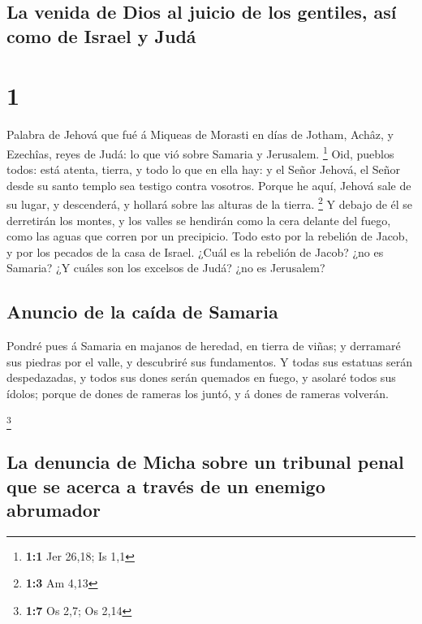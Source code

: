 \hypertarget{la-venida-de-dios-al-juicio-de-los-gentiles-asuxed-como-de-israel-y-juduxe1}{%
\subsection{La venida de Dios al juicio de los gentiles, así como de
Israel y
Judá}\label{la-venida-de-dios-al-juicio-de-los-gentiles-asuxed-como-de-israel-y-juduxe1}}

\hypertarget{section}{%
\section{1}\label{section}}

 Palabra de Jehová que fué á Miqueas de Morasti en días de
Jotham, Achâz, y Ezechîas, reyes de Judá: lo que vió sobre Samaria y
Jerusalem. \footnote{\textbf{1:1} Jer 26,18; Is 1,1}  Oid,
pueblos todos: está atenta, tierra, y todo lo que en ella hay: y el
Señor Jehová, el Señor desde su santo templo sea testigo contra
vosotros.  Porque he aquí, Jehová sale de su lugar, y
descenderá, y hollará sobre las alturas de la tierra. \footnote{\textbf{1:3}
  Am 4,13}  Y debajo de él se derretirán los montes, y los
valles se hendirán como la cera delante del fuego, como las aguas que
corren por un precipicio.  Todo esto por la rebelión de
Jacob, y por los pecados de la casa de Israel. ¿Cuál es la rebelión de
Jacob? ¿no es Samaria? ¿Y cuáles son los excelsos de Judá? ¿no es
Jerusalem?

\hypertarget{anuncio-de-la-cauxedda-de-samaria}{%
\subsection{Anuncio de la caída de
Samaria}\label{anuncio-de-la-cauxedda-de-samaria}}

 Pondré pues á Samaria en majanos de heredad, en tierra de
viñas; y derramaré sus piedras por el valle, y descubriré sus
fundamentos.  Y todas sus estatuas serán despedazadas, y
todos sus dones serán quemados en fuego, y asolaré todos sus ídolos;
porque de dones de rameras los juntó, y á dones de rameras volverán.

\footnote{\textbf{1:7} Os 2,7; Os 2,14}

\hypertarget{la-denuncia-de-micha-sobre-un-tribunal-penal-que-se-acerca-a-travuxe9s-de-un-enemigo-abrumador}{%
\subsection{La denuncia de Micha sobre un tribunal penal que se acerca a
través de un enemigo
abrumador}\label{la-denuncia-de-micha-sobre-un-tribunal-penal-que-se-acerca-a-travuxe9s-de-un-enemigo-abrumador}}


